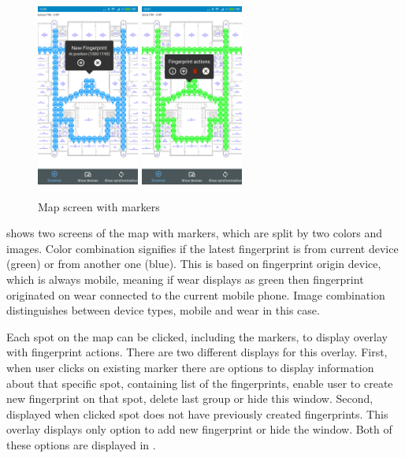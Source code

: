 \begin{figure}[h!]
	\begin{centering}
		\includegraphics[width=0.30\textwidth]{img/map_markers}
		\hspace{0.2cm}
		\includegraphics[width=0.30\textwidth]{img/map_markers_own}
		\par\end{centering}
	\caption{Map screen with markers\label{fig:map_with_markers}}
	\label{fig04c05}
\end{figure}

 shows two screens of the map with markers, which are split by two colors and images. Color combination signifies if the latest fingerprint is from current device (green) or from another one (blue). This is based on fingerprint origin device, which is always mobile, meaning if wear displays as green then fingerprint originated on wear connected to the current mobile phone. Image combination distinguishes between device types, mobile and wear in this case.

Each spot on the map can be clicked, including the markers, to display overlay with fingerprint actions. There are two different displays for this overlay. First, when user clicks on existing marker there are options to display information about that specific spot, containing list of the fingerprints, enable user to create new fingerprint on that spot, delete last group or hide this window. Second, displayed when clicked spot does not have previously created fingerprints. This overlay displays only option to add new fingerprint or hide the window. Both of these options are displayed in .

